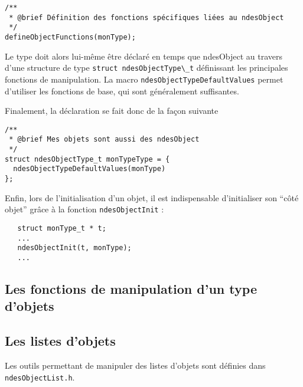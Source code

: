 \begin{verbatim}
/**
 * @brief Définition des fonctions spécifiques liées au ndesObject
 */
defineObjectFunctions(monType);
\end{verbatim}

   Le type doit alors lui-même être déclaré en temps que ndesObject au
travers d'une structure de type \lstinline{struct ndesObjectType\_t}
définissant les principales fonctions de manipulation. La macro
\lstinline{ndesObjectTypeDefaultValues} permet d'utiliser les
fonctions de base, qui sont généralement suffisantes.

   Finalement, la déclaration se fait donc de la façon suivante
   
\begin{verbatim}
/**
 * @brief Mes objets sont aussi des ndesObject
 */
struct ndesObjectType_t monTypeType = {
  ndesObjectTypeDefaultValues(monType)
};
\end{verbatim}

   Enfin, lors de l'initialisation d'un objet, il est indispensable
d'initialiser son ``côté objet'' grâce à la fonction
\lstinline!ndesObjectInit! :

\begin{verbatim}
   struct monType_t * t;
   ...
   ndesObjectInit(t, monType);
   ...
\end{verbatim}

%
\subsection{Les fonctions de manipulation d'un type d'objets}

%
\subsection{Les listes d'objets}

   Les outils permettant de manipuler des listes d'objets sont
définies dans {\tt ndesObjectList.h}.

%
